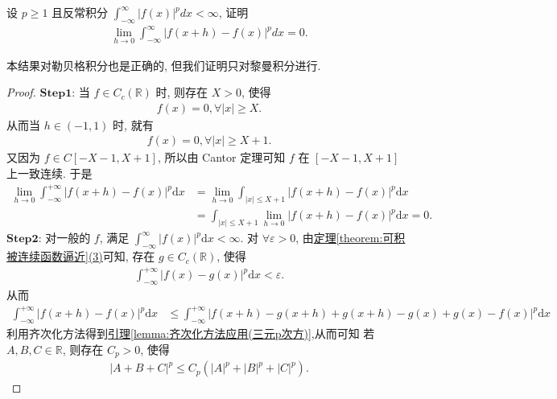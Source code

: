 \documentclass[../../main.tex]{subfiles}
\begin{document}
\begin{theorem}[积分的绝对连续性]\label{theorem:积分的绝对连续性}
设 $p \geqslant 1$ 且反常积分 $\int_{-\infty}^{\infty} |f(x)|^{p}dx < \infty$, 证明
\begin{align}
\lim_{h \to 0} \int_{-\infty}^{\infty} |f(x + h) - f(x)|^{p}dx = 0. \label{theorem-equation-积分的绝对连续性-13.118}
\end{align}
\end{theorem}
\begin{note}
本结果对勒贝格积分也是正确的, 但我们证明只对黎曼积分进行.
\end{note}
\begin{proof}
$\mathbf{Step}\mathbf{1}$: 当 $f\in C_c(\mathbb{R})$ 时, 则存在 $X>0$, 使得
\begin{align*}
f(x) = 0, \forall |x| \geqslant X.
\end{align*}
从而当 $h\in (-1,1)$ 时, 就有
\begin{align*}
f(x) = 0, \forall |x| \geqslant X + 1.
\end{align*}
又因为 $f\in C[-X - 1,X + 1]$, 所以由 Cantor 定理可知 $f$ 在 $[-X - 1,X + 1]$ 上一致连续. 于是
\begin{align*}
\lim_{h\rightarrow 0} \int_{-\infty}^{+\infty} |f(x + h) - f(x)|^p \mathrm{d}x &= \lim_{h\rightarrow 0} \int_{|x| \leqslant X + 1} |f(x + h) - f(x)|^p \mathrm{d}x \\
&= \int_{|x| \leqslant X + 1} \lim_{h\rightarrow 0} |f(x + h) - f(x)|^p \mathrm{d}x = 0.
\end{align*}
$\mathbf{Step}\mathbf{2}$: 对一般的 $f$, 满足 $\int_{-\infty}^{\infty} |f(x)|^p \mathrm{d}x < \infty$. 对 $\forall \varepsilon > 0$, 由\hyperref[theorem:可积被连续函数逼近]{定理\ref{theorem:可积被连续函数逼近}(3)}可知, 存在 $g\in C_c(\mathbb{R})$, 使得
\begin{align*}
\int_{-\infty}^{+\infty} |f(x) - g(x)|^p \mathrm{d}x < \varepsilon.
\end{align*}
从而
\begin{align*}
\int_{-\infty}^{+\infty} |f(x + h) - f(x)|^p \mathrm{d}x &\leqslant \int_{-\infty}^{+\infty} |f(x + h) - g(x + h) + g(x + h) - g(x) + g(x) - f(x)|^p \mathrm{d}x
\end{align*}
利用齐次化方法得到\hyperref[lemma:齐次化方法应用(三元p次方)]{引理\ref{lemma:齐次化方法应用(三元p次方)}},从而可知 若 $A,B,C\in \mathbb{R}$, 则存在 $C_p>0$, 使得
\begin{align*}
|A + B + C|^p \leqslant C_p(|A|^p + |B|^p + |C|^p).
\end{align*}

\end{proof}
\end{document}
